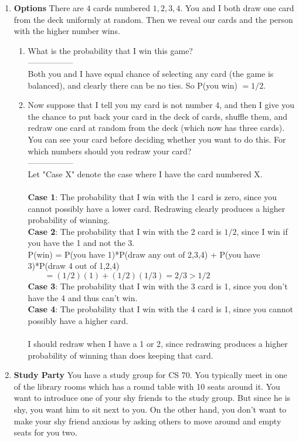 \documentclass[11pt,fleqn]{article}
\begin{document}
\begin{enumerate}
\newpage
\item \textbf{Options} There are $4$ cards numbered $1, 2, 3, 4$. You and I both draw one card from the deck uniformly at random. Then we reveal our cards and the person with the higher number wins.
\begin{enumerate}
\item What is the probability that I win this game? \\
-----------------\\
Both you and I have equal chance of selecting any card (the game is balanced), and clearly there can be no ties. So P(you win) $=1/2$.
\item Now suppose that I tell you my card is not number $4$, and then I give you the chance to put back your card in the deck of cards, shuffle them, and redraw one card at random from the deck (which now has three cards). You can see your card before deciding whether you want to do this. For which numbers should you redraw your card? \\
-----------------\\
Let "Case X" denote the case where I have the card numbered X. \\\\
\textbf{Case 1}: The probability that I win with the 1 card is zero, since you cannot possibly have a lower card. Redrawing clearly produces a higher probability of winning. \\
\textbf{Case 2}: The probability that I win with the 2 card is $1/2$, since I win if you have the 1 and not the 3. \\
    P(win) = P(you have 1)*P(draw any out of 2,3,4) + P(you have 3)*P(draw 4 out of 1,2,4) \\
    $\qquad = (1/2)(1) + (1/2)(1/3) = 2/3 > 1/2$ \\
\textbf{Case 3}: The probability that I win with the 3 card is 1, since you don't have the 4 and thus can't win. \\
\textbf{Case 4}: The probability that I win with the 4 card is 1, since you cannot possibly have a higher card. \\\\
I should redraw when I have a 1 or 2, since redrawing produces a higher probability of winning than does keeping that card. 
\end{enumerate}

\newpage
\item \textbf{Study Party} You have a study group for CS 70. You typically meet in one of the library rooms which has a round table with 10 seats around it. You want to introduce one of your shy friends to the study group. But since he is shy, you want him to sit next to you. On the other hand, you don't want to make your shy friend anxious by asking others to move around and empty seats for you two.


\end{enumerate}
\end{document}
